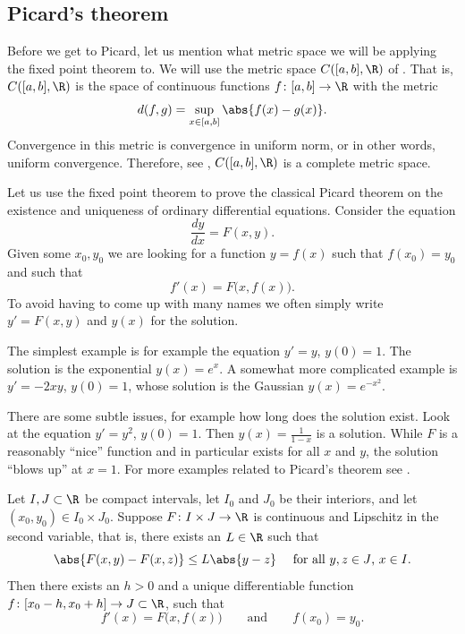 \documentclass[12pt]{book}
\begin{document}
\subsection*{Picard's theorem}

Before we get to Picard, let us mention what metric space we will be
applying the fixed point theorem to.
We will use the metric space
$C([a,b],\R)$ of .
That is, $C([a,b],\R)$
is the space of continuous functions $f \colon [a,b] \to \R$ with the metric
\begin{equation*}
d(f,g) = \sup_{x \in [a,b]} \abs{f(x)-g(x)} .
\end{equation*}
Convergence in this metric is convergence in uniform norm, or in other
words, uniform convergence.
Therefore, see
, $C([a,b],\R)$ is a complete metric space.

\medskip

Let us use the
fixed point theorem
to prove the classical Picard theorem on the existence and uniqueness of
ordinary differential equations.
Consider the equation
\begin{equation*}
\frac{dy}{dx} = F(x,y) .
\end{equation*}
Given some $x_0, y_0$ we are looking for a function $y=f(x)$ such that
$f(x_0) = y_0$ and such that
\begin{equation*}
f'(x) = F\bigl(x,f(x)\bigr) .
\end{equation*}
To avoid having to come up with many names we often simply write $y' = F(x,y)$
and $y(x)$ for the solution.

The simplest example is for example the equation $y' = y$, $y(0) = 1$.
The solution is the exponential $y(x) = e^x$.
A somewhat more complicated
example is $y' = -2xy$, $y(0) = 1$, whose solution is the Gaussian
$y(x) = e^{-x^2}$.

There are some subtle issues, for example how long does the
solution exist.
Look at the equation $y' = y^2$, $y(0)=1$.
Then $y(x) = \frac{1}{1-x}$ is a
solution.
While $F$ is a reasonably ``nice'' function and in particular
exists for all $x$ and $y$, the solution ``blows up'' at $x=1$.
For more examples related to Picard's theorem see .

\begin{thm}%
Let $I, J \subset \R$ be compact intervals, let $I_0$ and $J_0$
be their interiors, and 
let $(x_0,y_0) \in I_0 \times J_0$.
Suppose $F \colon I \times J \to \R$ is continuous
and Lipschitz in the second variable, that is, there exists
an $L \in \R$ such that
\begin{equation*}
\abs{F(x,y) - F(x,z)} \leq L \abs{y-z}
\ \ \ \text{ for all $y,z \in J$, $x \in I$} .
\end{equation*}
Then there exists an $h > 0$ and a unique differentiable
function
$f \colon [x_0 - h, x_0 + h] \to J \subset \R$, such that
\begin{equation*}
f'(x) = F\bigl(x,f(x)\bigr) \qquad \text{and} \qquad f(x_0) = y_0.
\end{equation*}
\end{thm}
\end{document}
